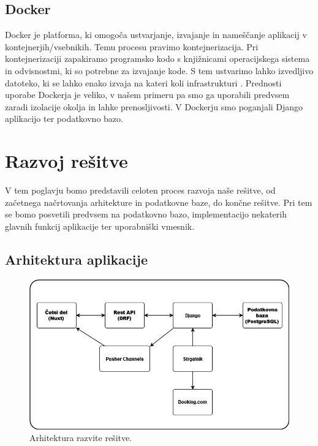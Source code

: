 \documentclass[a4paper,12pt,openright]{book}
\begin{document}
\section{Docker}
Docker je platforma, ki omogoča ustvarjanje, izvajanje in nameščanje aplikacij v kontejnerjih/vsebnikih. Temu procesu pravimo kontejnerizacija.
Pri kontejnerizaciji zapakiramo programsko kodo s knjižnicami operacijskega sistema in odvisnostmi, ki so potrebne za izvajanje kode.
S tem ustvarimo lahko izvedljivo datoteko, ki se lahko enako izvaja na kateri koli infrastrukturi \cite{containerization}.
Prednosti uporabe Dockerja je veliko, v našem primeru pa smo ga uporabili predvsem zaradi izolacije okolja in lahke prenosljivosti.
V Dockerju smo poganjali Django aplikacijo ter podatkovno bazo.

\chapter{Razvoj rešitve}
V tem poglavju bomo predstavili celoten proces razvoja naše rešitve, od začetnega načrtovanja arhitekture in podatkovne baze, do končne rešitve.
Pri tem se bomo posvetili predvsem na podatkovno bazo, implementacijo nekaterih glavnih funkcij aplikacije ter uporabniški vmesnik.

\section{Arhitektura aplikacije}

\begin{figure}[htb] %
\begin{center}
\includegraphics[width=\textwidth]{img/Architecture}
\end{center}
\caption{Arhitektura razvite rešitve.}
\label{architecture}
\end{figure}
\end{document}
